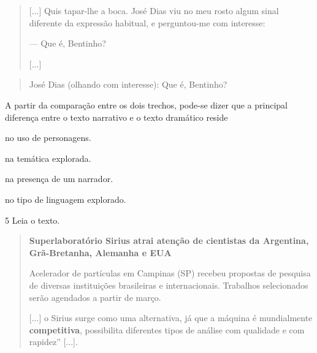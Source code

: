 \begin{quote}
{[}...{]} Quis tapar-lhe a boca. José Dias viu no meu rosto algum
sinal diferente da expressão habitual, e perguntou-me com interesse:

--- Que é, Bentinho?

{[}...{]}

\end{quote}


\begin{quote}
José Dias (olhando com interesse): Que é, Bentinho?

\end{quote}

A partir da comparação entre os dois trechos, pode-se dizer que a
principal diferença entre o texto narrativo e o texto dramático reside

\begin{minipage}{.5\textwidth}
\begin{escolha}
\item no uso de personagens.

\item na temática explorada.

\item na presença de um narrador.

\item no tipo de linguagem explorado.
\end{escolha}
\end{minipage}

\num{5} Leia o texto.

\begin{quote}
\textbf{Superlaboratório Sirius atrai atenção de cientistas da
Argentina, Grã-Bretanha, Alemanha e EUA}

Acelerador de partículas em Campinas (SP) recebeu propostas de
pesquisa de diversas instituições brasileiras e internacionais.
Trabalhos selecionados serão agendados a partir de março.

{[}...{]} o Sirius surge como uma alternativa, já que a máquina é
mundialmente \textbf{competitiva}, possibilita diferentes tipos de
análise com qualidade e com rapidez” {[}...{]}.

\end{quote}

